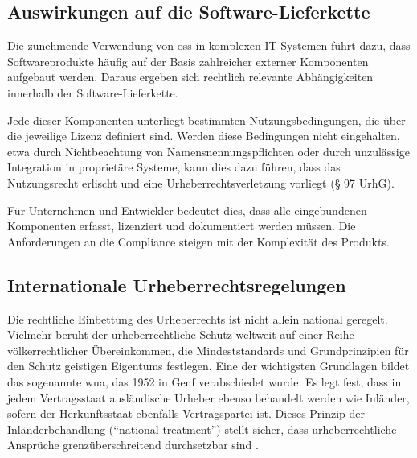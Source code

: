 

\subsection{Auswirkungen auf die Software-Lieferkette}

Die zunehmende Verwendung von \gls{oss} in komplexen IT-Systemen führt dazu, dass Softwareprodukte häufig auf der Basis zahlreicher externer Komponenten aufgebaut werden.
Daraus ergeben sich rechtlich relevante Abhängigkeiten innerhalb der Software-Lieferkette.

Jede dieser Komponenten unterliegt bestimmten Nutzungsbedingungen, die über die jeweilige Lizenz definiert sind.
Werden diese Bedingungen nicht eingehalten, etwa durch Nichtbeachtung von Namensnennungspflichten oder durch unzulässige Integration in proprietäre Systeme, kann dies dazu führen, dass das Nutzungsrecht erlischt und eine Urheberrechtsverletzung vorliegt (§ 97 UrhG).

Für Unternehmen und Entwickler bedeutet dies, dass alle eingebundenen Komponenten erfasst, lizenziert und dokumentiert werden müssen.
Die Anforderungen an die Compliance steigen mit der Komplexität des Produkts.


\subsection{Internationale Urheberrechtsregelungen}

Die rechtliche Einbettung des Urheberrechts ist nicht allein national geregelt.
Vielmehr beruht der urheberrechtliche Schutz weltweit auf einer Reihe völkerrechtlicher Übereinkommen, die Mindeststandards und Grundprinzipien für den Schutz geistigen Eigentums festlegen.
Eine der wichtigsten Grundlagen bildet das sogenannte \gls{wua}, das 1952 in Genf verabschiedet wurde.
Es legt fest, dass in jedem Vertragsstaat ausländische Urheber ebenso behandelt werden wie Inländer, sofern der Herkunftsstaat ebenfalls Vertragspartei ist.
Dieses Prinzip der Inländerbehandlung (\enquote{national treatment}) stellt sicher, dass urheberrechtliche Ansprüche grenzüberschreitend durchsetzbar sind \autocite{meckel_definition_nodate}.

